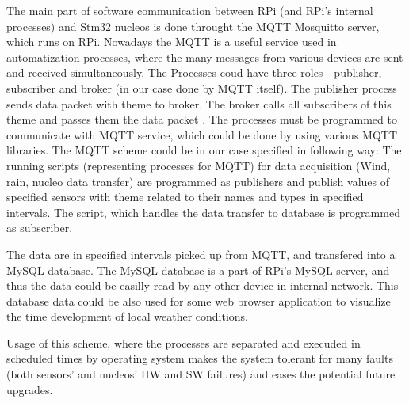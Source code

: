 \par
The main part of software communication between RPi (and RPi's internal processes) and Stm32 nucleos is done throught the MQTT Mosquitto server, which runs on RPi. Nowadays the MQTT is a useful service used in automatization processes, where the many messages from various devices are sent and received simultaneously. The Processes coud have three roles - publisher, subscriber and broker (in our case done by MQTT itself). The publisher process sends data packet with theme to broker. The broker calls all subscribers of this theme and passes them the data packet \cite{MqttServ}. The processes must be programmed to communicate with MQTT service, which could be done by using various MQTT libraries. The MQTT scheme could be in our case specified in following way: The running scripts (representing processes for MQTT) for data acquisition (Wind, rain, nucleo data transfer) are programmed as publishers and publish values of specified sensors with theme related to their names and types in specified intervals. The script, which handles the data transfer to database is programmed as subscriber.


\par
The data are in specified intervals picked up from MQTT, and transfered into a MySQL database. The MySQL database is a part of RPi's MySQL server, and thus the data could be easilly read by any other device in internal network. This database data could be also used for some web browser application to visualize the time development of local weather conditions.

\par

Usage of this scheme, where the processes are separated and execuded in scheduled times by operating system makes the system tolerant for many faults (both sensors' and nucleos' HW and SW failures) and eases the potential future upgrades.


